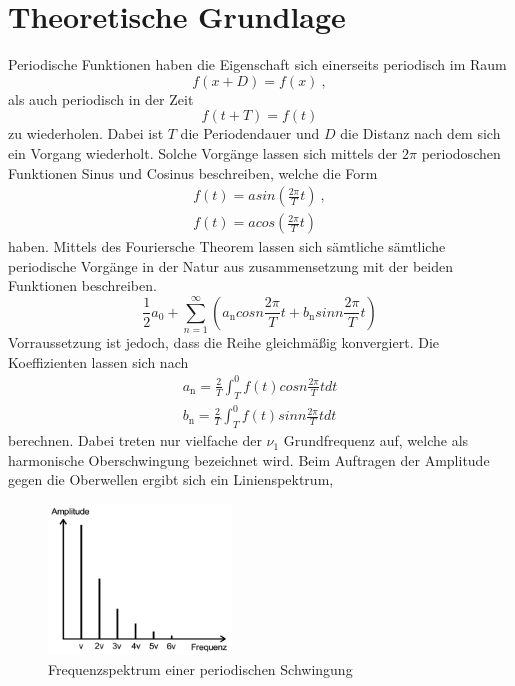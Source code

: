 \section{Theoretische Grundlage}
\label{sec:Theorie}
Periodische Funktionen haben die Eigenschaft sich einerseits periodisch im Raum
\begin{equation}
  f(x + D) = f(x) \ ,
  \label{eqn:f(x)}
\end{equation}
als auch periodisch in der Zeit 
\begin{equation}
  f(t + T) =f(t)
  \label{eqn:f(t)}
\end{equation}
zu wiederholen. Dabei ist $T$ die Periodendauer und $D$ die Distanz nach dem sich ein Vorgang wiederholt. Solche Vorgänge lassen sich mittels der $2 \pi$ periodoschen Funktionen Sinus und Cosinus beschreiben, welche die Form 
\begin{eqnarray}
  f(t) = a sin \left( \frac{2 \pi}{T} t \right) \ ,	\\
  f(t) = a cos \left( \frac{2 \pi}{T} t \right)
  \label{eqn:sin}
\end{eqnarray}
haben. Mittels des Fouriersche Theorem lassen sich sämtliche sämtliche periodische Vorgänge in der Natur aus zusammensetzung mit der beiden Funktionen beschreiben.
\begin{equation}
  \frac{1}{2} a_0 + \sum^{\infty}_{n=1} \left( a_\text{n} cos n \frac{2 \pi}{T} t + b_\text{n} sin n \frac{2 \pi}{T} t \right) 
  \label{eqn:fourier}
\end{equation}
Vorraussetzung ist jedoch, dass die Reihe gleichmäßig konvergiert. Die Koeffizienten lassen sich nach
\begin{eqnarray}
  a_\text{n} = \frac{2}{T} \int^0_T f(t) cos n \frac{2 \pi}{T} t dt	\\
  b_\text{n} = \frac{2}{T} \int^0_T f(t) sin n \frac{2 \pi}{T} t dt
  \label{eqn:Koef}
\end{eqnarray}
berechnen. Dabei treten nur vielfache der $\nu_1$ Grundfrequenz auf, welche als harmonische Oberschwingung bezeichnet wird. Beim Auftragen der Amplitude gegen die Oberwellen ergibt sich ein Linienspektrum,
\begin{figure}
  \centering
  \includegraphics[height=4cm]{picture/Frequenzspektrum.png}
  \caption{Frequenzspektrum einer periodischen Schwingung}
  \label{fig:fre}
\end{figure}
